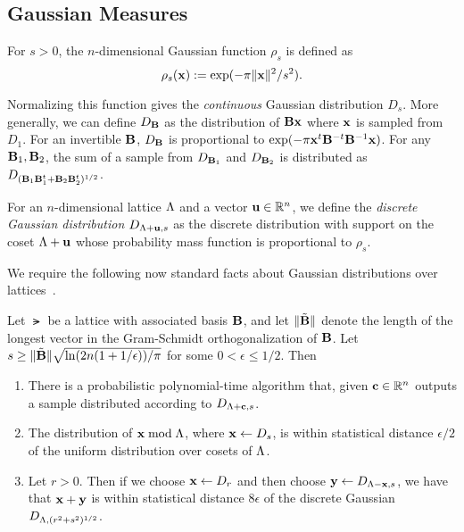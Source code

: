 \fi


\iflncs

\else
\subsection{Gaussian Measures}
\label{sec:gaussian-measures}

For $s > 0$, the $n$-dimensional Gaussian function $\rho_{s}$ is
defined as \[\rho_s(\mathbf{x}) := \text{exp}(-\pi\lVert\mathbf{x}\rVert^2/s^2).\]

Normalizing this function gives the \emph{continuous} Gaussian
distribution $D_{s}$. More generally, we can define $D_{\mathbf{B}}$ as the
distribution of $\mathbf{B}\mathbf{x}$ where $\mathbf{x}$ is sampled from $D_{1}$. For
an invertible $\mathbf{B}$, $D_{\mathbf{B}}$ is proportional to
$\text{exp}(-\pi\mathbf{x}^{t}\mathbf{B}^{-t}\mathbf{B}^{-1}\mathbf{x})$. For any
$\mathbf{B}_1, \mathbf{B}_2$, the sum of a sample from $D_{\mathbf{B}_1}$ and
$D_{\mathbf{B}_2}$ is distributed as
$D_{(\mathbf{B}_1\mathbf{B}_1^{t}+\mathbf{B}_2\mathbf{B}_2^{t})^{1/2}}$.

For an $n$-dimensional lattice $\Lambda$ and a vector $\mathbf{u} \in \mathbb{R}^{n}$,
we define the \emph{discrete Gaussian distribution} $D_{\Lambda+\mathbf{u},s}$
as the discrete distribution with support on the coset $\Lambda+\mathbf{u}$
whose probability mass function is proportional to $\rho_{s}$. 

We require the following now standard facts about Gaussian distributions
over lattices~\cite{DBLP:journals/siamcomp/MicciancioR07,DBLP:conf/stoc/GentryPV08,DBLP:conf/stoc/BrakerskiLPRS13}.
\begin{lemma}\label{lem:latt-facts}
Let $\lat$ be a lattice with associated basis $\mathbf{B}$, and let
$\lVert\tilde{\mathbf{B}}\rVert$ denote the length of the longest vector in
the Gram-Schmidt orthogonalization of $\mathbf{B}$. Let $s \geq
  \lVert\tilde{\mathbf{B}}\rVert\sqrt{\ln(2n(1+1/\epsilon))/\pi}$ for some $0 <
  \epsilon \leq 1/2$. Then 
\begin{enumerate}
\item There is a probabilistic polynomial-time algorithm that, given
$\mathbf{c} \in \mathbb{R}^{n}$ outputs a sample distributed according to
  $D_{\Lambda+\mathbf{c},s}$.
\item The distribution of $\mathbf{x} \bmod{\Lambda}$, where $\mathbf{x} \gets
  D_{s}$, is within statistical distance $\epsilon/2$ of the uniform
  distribution over cosets of $\Lambda$. 
\item Let $r > 0$. Then if we choose $\mathbf{x} \gets D_{r}$ and then
  choose $\mathbf{y} \gets D_{\Lambda-\mathbf{x},s}$, we have that $\mathbf{x}+\mathbf{y}$ is
  within statistical distance $8\epsilon$ of the discrete Gaussian $D_{\Lambda,(r^2+s^2)^{1/2}}$.
\end{enumerate}
\end{lemma}

